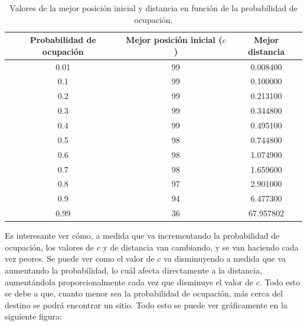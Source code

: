 \documentclass[11pt,a4paper]{report}
\begin{document}
\begin{table}[H]
\begin{tabular}{c|c|c}
\textbf{Probabilidad de ocupación} & \textbf{Mejor posición inicial ($c$)} & \textbf{Mejor distancia} \\ \hline
0.01                               & 99                              & 0.008400                 \\
0.1                                & 99                              & 0.100000                 \\
0.2                                & 99                              & 0.213100                 \\
0.3                                & 99                              & 0.344800                 \\
0.4                                & 99                              & 0.495100                 \\
0.5                                & 98                              & 0.744800                 \\
0.6                                & 98                              & 1.074900                 \\
0.7                                & 98                              & 1.659600                 \\
0.8                                & 97                              & 2.901000                 \\
0.9                                & 94                              & 6.477300                 \\
0.99                               & 36                              & 67.957802               
\end{tabular}
\caption{Valores de la mejor posición inicial y distancia en función de la probabilidad de ocupación.}
\label{aparc-tabla-prob}
\end{table}

Es interesante ver cómo, a medida que va incrementando la probabilidad de ocupación, los valores de $c$ y de distancia
van cambiando, y se van haciendo cada vez peores. Se puede ver como el valor de $c$ va disminuyendo a medida que va aumentando
la probabilidad, lo cuál afecta directamente a la distancia, aumentándola proporcionalmente cada vez que disminuye el valor de
$c$. Todo esto se debe a que, cuanto menor sea la probabilidad de ocupación, más cerca del destino se podrá encontrar un sitio.
Todo esto se puede ver gráficamente en la siguiente figura:
\end{document}
